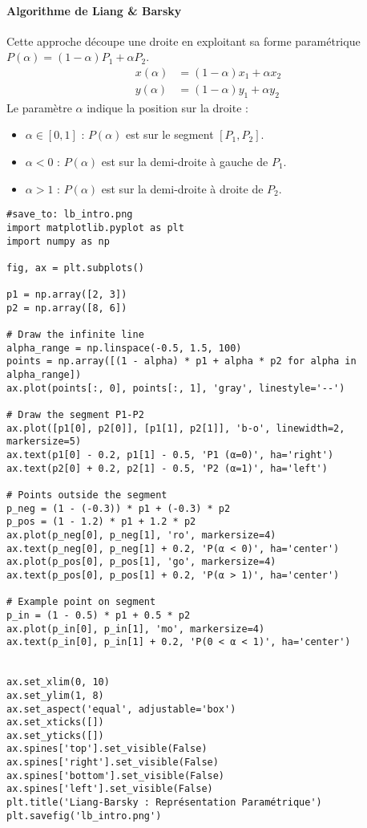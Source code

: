 \documentclass{article}
\begin{document}
\paragraph{Algorithme de Liang \& Barsky}
Cette approche découpe une droite en exploitant sa forme paramétrique $P(\alpha) = (1-\alpha)P_1 + \alpha P_2$.
\begin{align*} x(\alpha) &= (1-\alpha)x_1 + \alpha x_2 \\ y(\alpha) &= (1-\alpha)y_1 + \alpha y_2 \end{align*}
Le paramètre $\alpha$ indique la position sur la droite :
\begin{itemize}
    \item $\alpha \in [0, 1]$ : $P(\alpha)$ est sur le segment $[P_1, P_2]$.
    \item $\alpha < 0$ : $P(\alpha)$ est sur la demi-droite à gauche de $P_1$.
    \item $\alpha > 1$ : $P(\alpha)$ est sur la demi-droite à droite de $P_2$.
\end{itemize}

\begin{verbatim}
#save_to: lb_intro.png
import matplotlib.pyplot as plt
import numpy as np

fig, ax = plt.subplots()

p1 = np.array([2, 3])
p2 = np.array([8, 6])

# Draw the infinite line
alpha_range = np.linspace(-0.5, 1.5, 100)
points = np.array([(1 - alpha) * p1 + alpha * p2 for alpha in alpha_range])
ax.plot(points[:, 0], points[:, 1], 'gray', linestyle='--')

# Draw the segment P1-P2
ax.plot([p1[0], p2[0]], [p1[1], p2[1]], 'b-o', linewidth=2, markersize=5)
ax.text(p1[0] - 0.2, p1[1] - 0.5, 'P1 (α=0)', ha='right')
ax.text(p2[0] + 0.2, p2[1] - 0.5, 'P2 (α=1)', ha='left')

# Points outside the segment
p_neg = (1 - (-0.3)) * p1 + (-0.3) * p2
p_pos = (1 - 1.2) * p1 + 1.2 * p2
ax.plot(p_neg[0], p_neg[1], 'ro', markersize=4)
ax.text(p_neg[0], p_neg[1] + 0.2, 'P(α < 0)', ha='center')
ax.plot(p_pos[0], p_pos[1], 'go', markersize=4)
ax.text(p_pos[0], p_pos[1] + 0.2, 'P(α > 1)', ha='center')

# Example point on segment
p_in = (1 - 0.5) * p1 + 0.5 * p2
ax.plot(p_in[0], p_in[1], 'mo', markersize=4)
ax.text(p_in[0], p_in[1] + 0.2, 'P(0 < α < 1)', ha='center')


ax.set_xlim(0, 10)
ax.set_ylim(1, 8)
ax.set_aspect('equal', adjustable='box')
ax.set_xticks([])
ax.set_yticks([])
ax.spines['top'].set_visible(False)
ax.spines['right'].set_visible(False)
ax.spines['bottom'].set_visible(False)
ax.spines['left'].set_visible(False)
plt.title('Liang-Barsky : Représentation Paramétrique')
plt.savefig('lb_intro.png')
\end{verbatim}
\end{document}
